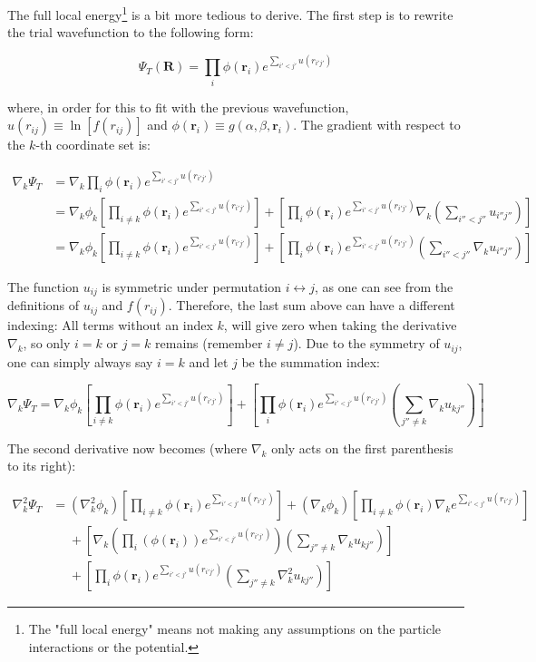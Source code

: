 \documentclass[english, a4paper]{article}
\newcommand{\bm}[1]{\mathbf{#1}}
\begin{document}
The full local energy\footnote{The "full local energy" means not making any assumptions on the particle interactions or the potential.} is a bit more tedious to derive. The first step is to rewrite the trial wavefunction to the following form:

\begin{equation}
	\Psi_T(\bm{R}) = \prod_{i} \phi(\bm{r}_i)e^{\sum_{i'<j'}u(r_{i'j'})}
\end{equation}

where, in order for this to fit with the previous wavefunction, $u(r_{ij}) \equiv \ln[f(r_{ij})]$ and $\phi(\bm{r}_i) \equiv g(\alpha,\beta,\bm{r}_i)$. The gradient with respect to the $k$-th coordinate set is:

\begin{align}
	\nabla_k\Psi_T &= \nabla_k\prod_i \phi(\bm{r}_i)e^{\sum_{i'<j'}u(r_{i'j'})}\\
	&= \nabla_k\phi_k\left[\prod_{i\neq k} \phi(\bm{r}_i)e^{\sum_{i'<j'}u(r_{i'j'})}\right] + \left[\prod_i \phi(\bm{r}_i)e^{\sum_{i'<j'}u(r_{i'j'})}\nabla_k\left(\sum_{i''<j''}u_{i''j''} \right)\right]\\
	&= \nabla_k\phi_k\left[\prod_{i\neq k} \phi(\bm{r}_i)e^{\sum_{i'<j'}u(r_{i'j'})}\right] + \left[\prod_i \phi(\bm{r}_i)e^{\sum_{i'<j'}u(r_{i'j'})}\left(\sum_{i''<j''}\nabla_ku_{i''j''} \right)\right]
\end{align}

The function $u_{ij}$ is symmetric under permutation $i \leftrightarrow j$, as one can see from the definitions of $u_{ij}$ and $f(r_{ij})$. Therefore, the last sum above can have a different indexing: All terms without an index $k$, will give zero when taking the derivative $\nabla_k$, so only $i=k$ or $j=k$ remains (remember $i \neq j$). Due to the symmetry of $u_{ij}$, one can simply always say $i=k$ and let $j$ be the summation index:

\begin{equation}
	\nabla_k\Psi_T = \nabla_k\phi_k\left[\prod_{i\neq k} \phi(\bm{r}_i)e^{\sum_{i'<j'}u(r_{i'j'})}\right] + \left[\prod_i \phi(\bm{r}_i)e^{\sum_{i'<j'}u(r_{i'j'})}\left(\sum_{j''\neq k}\nabla_ku_{kj''} \right)\right]
	\label{eq:grad}
\end{equation}

The second derivative now becomes (where $\nabla_k$ only acts on the first parenthesis to its right):

\begin{align*}
	\nabla_k^2\Psi_T &= (\nabla_k^2\phi_k)\left[\prod_{i\neq k} \phi(\bm{r}_i)e^{\sum_{i'<j'}u(r_{i'j'})}\right] + (\nabla_k\phi_k) \left[\prod_{i\neq k}\phi(\bm{r}_i)\nabla_ke^{\sum_{i'<j'}u(r_{i'j'})}\right]\\
	&\:\:\:\:\:\: + \left[\nabla_k\left(\prod_i \left(\phi(\bm{r}_i)\right)e^{\sum_{i'<j'}u(r_{i'j'})}\right)\left(\sum_{j''\neq k}\nabla_ku_{kj''} \right)\right]\\
	&\:\:\:\:\:\: + \left[\prod_i \phi(\bm{r}_i)e^{\sum_{i'<j'}u(r_{i'j'})}\left(\sum_{j''\neq k}\nabla_k^2u_{kj''} \right)\right]
\end{align*}
\end{document}
